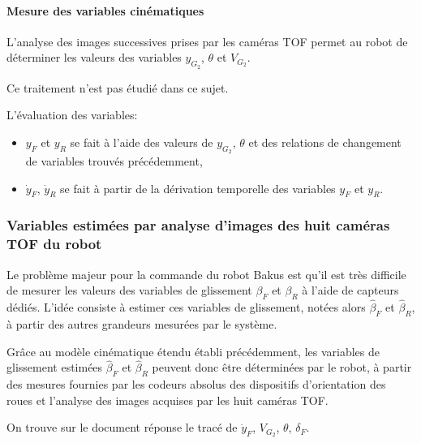 \paragraph{Mesure des variables cinématiques}

L'analyse des images successives prises par les caméras TOF permet au robot de déterminer les valeurs des variables $y_{G_2}$, $\theta$ et $V_{G_2}$. 

Ce traitement n'est pas étudié dans ce sujet.

L'évaluation des variables:
\begin{itemize}
  \item $y_F$ et $y_R$ se fait à l'aide des valeurs de $y_{G_2}$, $\theta$ et des relations de changement de variables trouvés précédemment,
  \item $\dot{y}_F$, $\dot{y}_R$ se fait à partir de la dérivation temporelle des variables $y_F$ et $y_R$.
\end{itemize}

\subsubsection{Variables estimées par analyse d'images des huit caméras TOF du robot}

Le problème majeur pour la commande du robot Bakus est qu'il est très difficile de mesurer les valeurs des variables de glissement $\beta_F$ et $\beta_R$ à l'aide de capteurs dédiés. L'idée consiste à estimer ces variables de glissement, notées alors $\widehat{\beta}_F$ et $\widehat{\beta}_R$, à partir des autres grandeurs mesurées par le système.


Grâce au modèle cinématique étendu établi précédemment, les variables de glissement estimées $\widehat{\beta}_F$ et $\widehat{\beta}_R$ peuvent
donc être déterminées par le robot, à partir des mesures fournies par les codeurs absolus des dispositifs d'orientation des roues et l'analyse des images acquises par les huit caméras TOF.

On trouve sur le document réponse le tracé de $\dot{y}_F$, $V_{G_2}$, $\theta$, $\delta_F$. 


